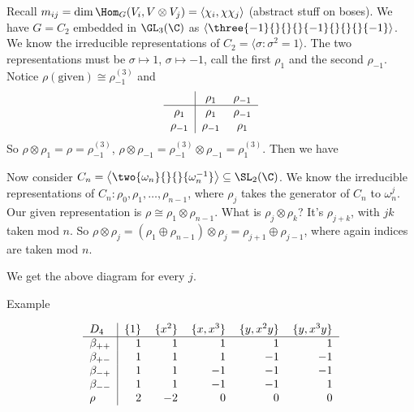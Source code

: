 

Recall $m_{ij}= \dim \Hom_G(V_i, V \otimes V_j)= \langle \chi_i, \chi\chi_j \rangle$ (abstract stuff on boses). We have $G=C_2$ embedded in $\GL_3(\C)$ as $\left\langle \three{-1}{}{}{}{-1}{}{}{}{-1} \right\rangle$. We know the irreducible representations of $C_2= \langle \sigma \colon \sigma^2=1\rangle$. The two representations must be $\sigma \mapsto 1$, $ \sigma \mapsto -1$, call the first $\rho_1$ and the second $\rho_{-1}$. Notice $\rho(\text{given}) \cong \rho_{-1}^{(3)}$ and 
	\[
	\begin{tabular}{c|cc}
	& $\rho_1$ & $\rho_{-1}$ \\ \hline
	$\rho_1$ & $\rho_1$ & $\rho_{-1}$ \\
	$\rho_{-1}$ & $\rho_{-1}$ & $\rho_1$ 
	\end{tabular}
	\]
So $\rho \otimes \rho_1= \rho = \rho_{-1}^{(3)}$, $\rho \otimes \rho_{-1} = \rho_{-1}^{(3)} \otimes \rho_{-1} = \rho_1^{(3)}$. Then we have


Now consider $C_n= \left\langle \two{\omega_n}{}{}{\omega_n^{-1}} \right\rangle \subseteq \SL_2(\C)$. We know the irreducible representations of $C_n: \rho_0,\rho_1,\ldots,\rho_{n-1}$, where $\rho_j$ takes the generator of $C_n$ to $\omega_n^j$. Our given representation is $\rho \cong \rho_1 \otimes \rho_{n-1}$. What is $\rho_j \otimes \rho_k$? It's $\rho_{j+k}$, with $jk$ taken mod $n$. So $\rho \otimes \rho_j= (\rho_1 \oplus \rho_{n-1}) \otimes \rho_j= \rho_{j+1} \oplus \rho_{j-1}$, where again indices are taken mod $n$. 



We get the above diagram for every $j$. 




Example

	\[
	\begin{tabular}{l |rrrrr}
	$D_4$ & $\{1\}$ & $\{x^2\}$ & $\{x,x^3\}$ & $\{y,x^2y\}$ & $\{y,x^3y\}$ \\ \hline
	$\beta_{++}$ & 1 & 1 & 1 & 1 & 1 \\
	$\beta_{+-}$ & 1 & 1 & 1 & $-1$ & $-1$ \\
	$\beta_{-+}$ & 1 & 1 & $-1$ & $-1$ & $-1$ \\
	$\beta_{--}$ & 1 & 1 & $-1$ & $-1$ & 1 \\
	$\rho$ & 2 & $-2$ & 0 & 0 & 0 
	\end{tabular}
	\]


